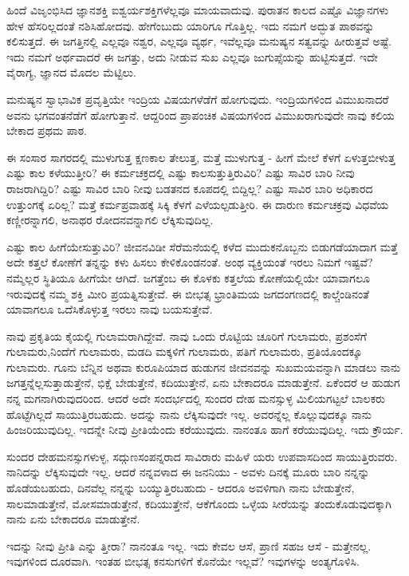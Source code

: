 ಹಿಂದೆ ವಿಜೃಂಭಿಸಿದ ಜ್ಞಾನಶಕ್ತಿ ಐಶ್ವರ್ಯಶಕ್ತಿಗಳೆಲ್ಲವೂ ಮಾಯವಾದುವು. ಪುರಾತನ ಕಾಲದ ಎಷ್ಟೊ ವಿಜ್ಞಾನಗಳು ಹೇಳ ಹೆಸರಿಲ್ಲದಂತೆ ನಶಿಸಿಹೋದವು. ಹೇಗೆಂಬುದು ಯಾರಿಗೂ ಗೊತ್ತಿಲ್ಲ. ಇದು ನಮಗೆ ಅದ್ಭುತ ಪಾಠವನ್ನು ಕಲಿಸುತ್ತದೆ. ಈ ಜಗತ್ತಿನಲ್ಲಿ ಎಲ್ಲವೂ ನಶ್ವರ, ಎಲ್ಲವೂ ವ್ಯರ್ಥ, ಇವೆಲ್ಲವೂ ಮನುಷ್ಯನ ಸತ್ವವನ್ನು ಹೀರುತ್ತವೆ ಅಷ್ಟೆ. ಇದು ನಮಗೆ ಅರ್ಥವಾದರೆ ಈ ಜಗತ್ತು, ಅದು ನೀಡುವ ಸುಖ ಎಲ್ಲವೂ ಜುಗುಪ್ಸೆಯನ್ನು ಹುಟ್ಟಿಸುತ್ತದೆ. ಇದೇ ವೈರಾಗ್ಯ, ಜ್ಞಾನದ ಮೊದಲ ಮೆಟ್ಟಿಲು.

ಮನುಷ್ಯನ ಸ್ವಾಭಾವಿಕ ಪ್ರವೃತ್ತಿಯೇ ಇಂದ್ರಿಯ ವಿಷಯಗಳೆಡೆಗೆ ಹೋಗುವುದು. ಇಂದ್ರಿಯಗಳಿಂದ ವಿಮುಖನಾದರೆ ಅವನು ಭಗವಂತನೆಡೆಗೆ ಹೋಗುತ್ತಾನೆ. ಆದ್ದರಿಂದ ಪ್ರಾಪಂಚಿಕ ವಿಷಯಗಳಿಂದ ವಿಮುಖರಾಗುವುದೇ ನಾವು ಕಲಿಯ ಬೇಕಾದ ಪ್ರಥಮ ಪಾಠ.

ಈ ಸಂಸಾರ ಸಾಗರದಲ್ಲಿ ಮುಳುಗುತ್ತ ಕ್ಷಣಕಾಲ ತೇಲುತ್ತ, ಮತ್ತೆ ಮುಳುಗುತ್ತ - ಹೀಗೆ ಮೇಲೆ ಕೆಳಗೆ ಏಳುತ್ತಬೀಳುತ್ತ ಎಷ್ಟು ಕಾಲ ಕಳೆಯುತ್ತೀರಿ? ಈ ಕರ್ಮಚಕ್ರದಲ್ಲಿ ಎಷ್ಟು ಕಾಲಸುತ್ತುತ್ತಿರುವಿರಿ? ಎಷ್ಟು ಸಾವಿರ ಬಾರಿ ನೀವು ರಾಜರಾಗಿದ್ದಿರಿ? ಎಷ್ಟು ಸಾವಿರ ಬಾರಿ ನೀವು ಬಡತನದ ಕೂಪದಲ್ಲಿ ಬಿದ್ದಿಲ್ಲ? ಎಷ್ಟು ಸಾವಿರ ಬಾರಿ ಅಧಿಕಾರದ ಉತ್ತುಂಗಕ್ಕೆ ಏರಿಲ್ಲ? ಮತ್ತೆ ಕರ್ಮಪ್ರವಾಹಕ್ಕೆ ಸಿಕ್ಕಿ ಕೆಳಗೆ ಎಳೆಯಲ್ಪಡುತ್ತೀರಿ. ಈ ದಾರುಣ ಕರ್ಮಚಕ್ರವು ವಿಧವೆಯ ಕಣ್ಣೀರನ್ನಾಗಲಿ, ಅನಾಥರ ರೋದನವನ್ನಾಗಲಿ ಲೆಕ್ಕಿಸುವುದಿಲ್ಲ.

ಎಷ್ಟು ಕಾಲ ಹೀಗೆಯೇಸುತ್ತುವಿರಿ? ಜೀವನವಿಡೀ ಸೆರೆಮನೆಯಲ್ಲಿ ಕಳೆದ ಮುದುಕನೊಬ್ಬನು ಬಿಡುಗಡೆಯಾದಾಗ ಮತ್ತೆ ಅದೇ ಕತ್ತಲೆ ಕೋಣೆಗೆ ತನ್ನನ್ನು ಕಳು ಹಿಸಲು ಕೇಳಿಕೊಂಡನಂತೆ. ಅಂಥ ವ್ಯಕ್ತಿಯಂತೆ ಇರಲು ನಿಮಗೆ ಇಷ್ಟವೆ? ನಮ್ಮೆಲ್ಲರ ಸ್ಥಿತಿಯೂ ಹೀಗೆಯೇ ಆಗಿದೆ. ಜಗತ್ತೆಂಬ ಈ ಕೊಳಕು ಕತ್ತಲೆಯ ಕೋಣೆಯಲ್ಲಿಯೇ ಯಾವಾಗಲೂ ಇರುವುದಕ್ಕೆ ನಮ್ಮ ಶಕ್ತಿ ಮೀರಿ ಪ್ರಯತ್ನಿಸುತ್ತೇವೆ. ಈ ಬೀಭತ್ಸ ಭ್ರಾಂತಿಮಯ ಜಗದಂಗಣದಲ್ಲಿ ಕಾಲ್ಚೆಂಡಿನಂತೆ ಯಾವಾಗಲೂ ಒದೆಸಿಕೊಳ್ಳುತ್ತ ಇರಲು ನಾವು ಬಯಸುತ್ತೇವೆ.

ನಾವು ಪ್ರಕೃತಿಯ ಕೈಯಲ್ಲಿ ಗುಲಾಮರಾಗಿದ್ದೇವೆ. ನಾವು ಒಂದು ರೊಟ್ಟಿಯ ಚೂರಿಗೆ ಗುಲಾಮರು, ಪ್ರಶಂಸೆಗೆ ಗುಲಾಮರು,ನಿಂದೆಗೆ ಗುಲಾಮರು, ಮಡದಿ ಮಕ್ಕಳಿಗೆ ಗುಲಾಮರು, ಪತಿಗೆ ಗುಲಾಮರು, ಪ್ರತಿಯೊಂದಕ್ಕೂ ಗುಲಾಮರು. ಗೂನು ಬೆನ್ನಿನ ಅಥವಾ ಕುರೂಪಿಯಾದ ಹುಡುಗನ ಜೀವನವನ್ನು ಸುಖಮಯವನ್ನಾಗಿ ಮಾಡಲು ನಾನು ಜಗತ್ತನ್ನೆಲ್ಲಸುತ್ತಾಡುತ್ತೇನೆ, ಭಿಕ್ಷೆ ಬೇಡುತ್ತೇನೆ, ಕದಿಯುತ್ತೇನೆ, ಏನು ಬೇಕಾದರೂ ಮಾಡುತ್ತೇನೆ. ಏಕೆಂದರೆ ಆ ಹುಡುಗ ನನ್ನ ಮಗನಾಗಿರುವುದರಿಂದ. ಆದರೆ ಅದೇ ಸಂದರ್ಭದಲ್ಲಿ ಸುಂದರ ದೇಹ ಮನಸ್ಸುಳ್ಳ ಮಿಲಿಯಗಟ್ಟಲೆ ಬಾಲಕರು ಹೊಟ್ಟೆಗಿಲ್ಲದೆ ಸಾಯುತ್ತಿರಬಹುದು. ಅದನ್ನು ನಾನು ಲೆಕ್ಕಿಸುವುದೇ ಇಲ್ಲ. ಅವರನ್ನೆಲ್ಲ ಕೊಲ್ಲುವುದಕ್ಕೂ ನಾನು ಹಿಂಜರಿಯುವುದಿಲ್ಲ. ಇದನ್ನೇ ನೀವು ಪ್ರೀತಿಯೆಂದು ಕರೆಯುವುದು. ನಾನಂತೂ ಹಾಗೆ ಕರೆಯುವುದಿಲ್ಲ. ಇದು ಕ್ರೌರ್ಯ.

ಸುಂದರ ದೇಹಮನಸ್ಸುಗಳುಳ್ಳ, ಸದ್ಗುಣಸಂಪನ್ನರಾದ ಸಾವಿರಾರು ಮಹಿಳೆ ಯರು ಉಪವಾಸದಿಂದ ಸಾಯುತ್ತಿರುವರು. ನಾನಿದನ್ನು ಲೆಕ್ಕಿಸುವುದೇ ಇಲ್ಲ. ಆದರೆ ನನ್ನವಳಾದ ಈ ಜನನಿಯು - ಅವಳು ದಿನಕ್ಕೆ ಮೂರು ಬಾರಿ ನನ್ನನ್ನು ಹೊಡೆಯಬಹುದು, ದಿನವೆಲ್ಲ ನನ್ನನ್ನು ಬಯ್ಯುತ್ತಿರಬಹುದು - ಆದರೂ ಅವಳಿಗಾಗಿ ನಾನು ಬೇಡುತ್ತೇನೆ, ಸಾಲಮಾಡುತ್ತೇನೆ, ಮೋಸಮಾಡುತ್ತೇನೆ, ಕದಿಯುತ್ತೇನೆ, ಆಕೆಗೊಂದು ಒಳ್ಳೆಯ ಸೀರೆಯನ್ನು ತಂದುಕೊಡುವುದಕ್ಕಾಗಿ ನಾನು ಏನು ಬೇಕಾದರೂ ಮಾಡುತ್ತೇನೆ.

ಇದನ್ನು ನೀವು ಪ್ರೀತಿ ಎನ್ನು ತ್ತೀರಾ? ನಾನಂತೂ ಇಲ್ಲ. ಇದು ಕೇವಲ ಆಸೆ, ಪ್ರಾಣಿ ಸಹಜ ಆಸೆ - ಮತ್ತೇನಲ್ಲ. ಇವುಗಳಿಂದ ದೂರವಾಗಿ. ಇಂತಹ ಬೀಭತ್ಸ ಕನಸುಗಳಿಗೆ ಕೊನೆಯೇ ಇಲ್ಲವೆ? ಇವುಗಳನ್ನು ಅಂತ್ಯಗೊಳಿಸಿ.

